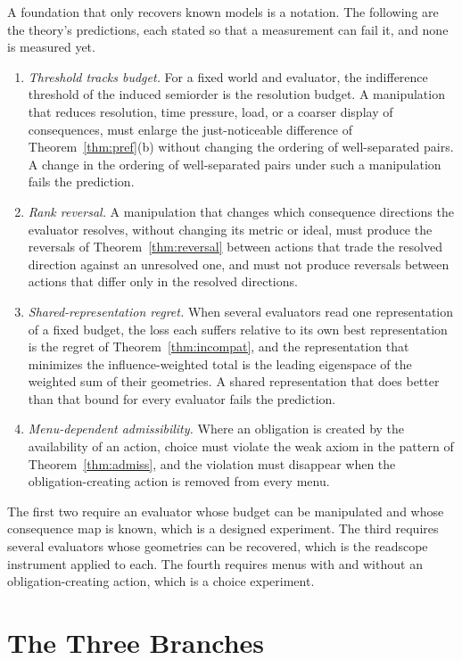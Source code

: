 \documentclass[11pt]{article}
\theoremstyle{definition}
\theoremstyle{remark}
\begin{document}
A foundation that only recovers known models is a notation.
The following are the theory's predictions, each stated so that a measurement can fail it, and none is measured yet.
\begin{enumerate}
\item[(i)] \emph{Threshold tracks budget.} For a fixed world and evaluator, the indifference threshold of the induced semiorder is the resolution budget. A manipulation that reduces resolution, time pressure, load, or a coarser display of consequences, must enlarge the just-noticeable difference of Theorem~\ref{thm:pref}(b) without changing the ordering of well-separated pairs. A change in the ordering of well-separated pairs under such a manipulation fails the prediction.
\item[(ii)] \emph{Rank reversal.} A manipulation that changes which consequence directions the evaluator resolves, without changing its metric or ideal, must produce the reversals of Theorem~\ref{thm:reversal} between actions that trade the resolved direction against an unresolved one, and must not produce reversals between actions that differ only in the resolved directions.
\item[(iii)] \emph{Shared-representation regret.} When several evaluators read one representation of a fixed budget, the loss each suffers relative to its own best representation is the regret of Theorem~\ref{thm:incompat}, and the representation that minimizes the influence-weighted total is the leading eigenspace of the weighted sum of their geometries. A shared representation that does better than that bound for every evaluator fails the prediction.
\item[(iv)] \emph{Menu-dependent admissibility.} Where an obligation is created by the availability of an action, choice must violate the weak axiom in the pattern of Theorem~\ref{thm:admiss}, and the violation must disappear when the obligation-creating action is removed from every menu.
\end{enumerate}
The first two require an evaluator whose budget can be manipulated and whose consequence map is known, which is a designed experiment.
The third requires several evaluators whose geometries can be recovered, which is the readscope instrument applied to each.
The fourth requires menus with and without an obligation-creating action, which is a choice experiment.

\section{The Three Branches}
\label{sec:branches}
\end{document}
